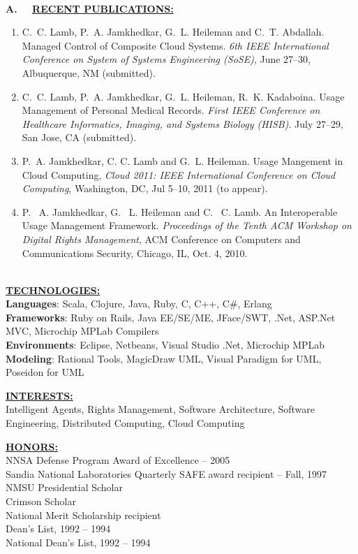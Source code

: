 \documentclass [11pt]{article}
\begin{document}
{{{{\textcolor{black}{\makebox[6.5in]{\hrulefill}} ~\\

{\bf A. \  \ \underline{RECENT PUBLICATIONS:}}
\begin{enumerate}
\item
C.~C. Lamb, P.~A. Jamkhedkar, G.~L. Heileman and C.~T. Abdallah. Managed Control of Composite Cloud Systems. {\sl 6th IEEE International Conference on 
System of Systems Engineering (SoSE)}, June 27--30, Albuquerque, NM (submitted).

\item 
C.~C. Lamb, P.~A. Jamkhedkar, G.~L. Heileman, R.~K. Kadaboina.  Usage Management of Personal Medical Records.  {\sl First IEEE Conference on Healthcare Informatics, Imaging, and Systems Biology (HISB)}. July 27--29, San Jose, CA (submitted).
 
\item
P.~A. Jamkhedkar, C. C. Lamb and G.~L. Heileman. Usage Mangement in Cloud Computing, {\sl Cloud 2011: IEEE International Conference on Cloud Computing}, Washington, DC, Jul 5--10, 2011 (to appear).

\item P. ~A. Jamkhedkar, G. ~L. Heileman and C. ~C. Lamb. An Interoperable Usage Management Framework. {\sl Proceedings of the Tenth ACM Workshop on Digital Rights Management}, ACM Conference on Computers and Communications Security, Chicago, IL, Oct. 4, 2010.
\end{enumerate} 

{\textcolor{black}{\makebox[6.5in]{\hrulefill}} ~\\


\underline{\bf TECHNOLOGIES:} ~\\
\textbf{Languages}: Scala, Clojure, Java, Ruby, C, C++, C\#, Erlang \\
\textbf{Frameworks}: Ruby on Rails, Java EE/SE/ME, JFace/SWT, .Net, ASP.Net MVC, Microchip MPLab Compilers \\
\textbf{Environments}: Eclipse, Netbeans, Visual Studio .Net, Microchip MPLab \\
\textbf{Modeling}: Rational Tools, MagicDraw UML, Visual Paradigm for UML, Poseidon for UML

\vspace*{0.2in}
\underline{\bf INTERESTS:} ~\\
Intelligent Agents, Rights Management, Software Architecture, Software Engineering, Distributed Computing, Cloud Computing

\vspace*{0.2in}
\underline{\bf HONORS:} ~\\
NNSA Defense Program Award of Excellence – 2005 \\ 
Sandia National Laboratories Quarterly SAFE award recipient – Fall, 1997 \\
NMSU Presidential Scholar \\
Crimson Scholar \\ 
National Merit Scholarship recipient \\ 
Dean's List, 1992 -- 1994 \\
National Dean's List, 1992 -- 1994 

}}}}}
\end{document}
